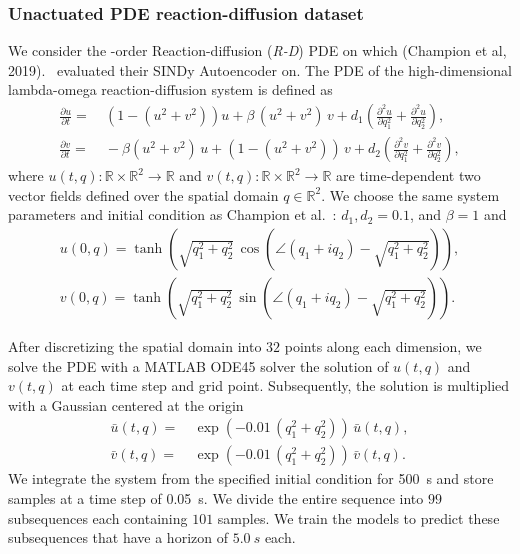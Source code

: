 \subsubsection{Unactuated PDE reaction-diffusion dataset}\label{ssub:con:reaction_diffusion_dataset}
 We consider the -order Reaction-diffusion (\emph{R-D}) \gls{PDE} on which (Champion et al, 2019).~\cite{champion2019data} evaluated their SINDy Autoencoder on. The \gls{PDE} of the high-dimensional lambda-omega reaction-diffusion system is defined as
\begin{equation}
\begin{split}
    \frac{\partial u}{\partial t} =& \: \left ( 1 - (u^2 + v^2) \right ) u + \beta \, (u^2 + v^2) \, v + d_1 \left ( \frac{\partial^2 u}{\partial q_1^2} + \frac{\partial^2 u}{\partial q_2^2} \right ),\\
    \frac{\partial v}{\partial t} =& \: -\beta (u^2 + v^2) \, u + (1 - (u^2 + v^2)) \, v + d_2 \left ( \frac{\partial^2 v}{\partial q_1^2} + \frac{\partial^2 v}{\partial q_2^2} \right ),
\end{split}
\end{equation}
where $u(t,q): \mathbb{R} \times \mathbb{R}^2 \to \mathbb{R}$ and $v(t,q): \mathbb{R} \times \mathbb{R}^2 \to \mathbb{R}$ are time-dependent two vector fields defined over the spatial domain $q \in \mathbb{R}^2$.
We choose the same system parameters and initial condition as Champion et al.~\cite{champion2019data}: $d_1, d_2 = 0.1$, and $\beta = 1$ and 
\begin{equation}
\begin{split}
    u(0,q) = \tanh \left ( \sqrt{q_1^2 + q_2^2} \, \cos \left ( \angle (q_1 + i q_2) - \sqrt{q_1^2 + q_2^2} \right ) \right ),\\
    v(0,q) = \tanh \left ( \sqrt{q_1^2 + q_2^2} \, \sin \left ( \angle (q_1 + i q_2) - \sqrt{q_1^2 + q_2^2} \right ) \right ).
\end{split}
\end{equation}

After discretizing the spatial domain into $32$ points along each dimension, we solve the \gls{PDE} with a MATLAB ODE45 solver the solution of $u(t,q)$ and $v(t,q)$ at each time step and grid point.
Subsequently, the solution is multiplied with a Gaussian centered at the origin~\cite{champion2019data}
\begin{equation}
\begin{split}
    \bar{u}(t,q) =& \: \exp(-0.01 \, (q_1^2 + q_2^2)) \, \bar{u}(t,q),\\
    \bar{v}(t,q) =& \: \exp(-0.01 \, (q_1^2 + q_2^2)) \, \bar{v}(t,q).
\end{split}
\end{equation}
We integrate the system from the specified initial condition for \SI{500}{s} and store samples at a time step of \SI{0.05}{s}. We divide the entire sequence into $99$ subsequences each containing $101$ samples. We train the models to predict these subsequences that have a horizon of $\SI{5.0}{s}$ each.

